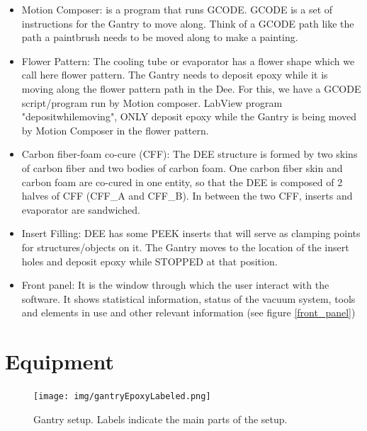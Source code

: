 \documentclass[12pt]{cornelltfpxsop}
\begin{document}
\begin{itemize}
    \item Motion Composer: is a program that runs GCODE. GCODE is a set of instructions for the Gantry to move along. Think of a GCODE path like the path a paintbrush needs to be moved along to make a painting.
    \item Flower Pattern: The cooling tube or evaporator has a flower shape which we call here flower pattern. The Gantry needs to deposit epoxy while it is moving along the flower pattern path in the Dee. For this, we have a GCODE script/program run by Motion composer. LabView program "depositwhilemoving", ONLY deposit epoxy while the Gantry is being moved by Motion Composer in the flower pattern.
    \item Carbon fiber-foam co-cure (CFF): The DEE structure is formed by two skins of carbon fiber and two bodies of carbon foam. One carbon fiber skin and carbon foam are co-cured in one entity, so that the DEE is composed of 2 halves of CFF (CFF\_A and CFF\_B). In between the two CFF, inserts and evaporator are sandwiched.    
    \item Insert Filling: DEE has some PEEK inserts that will serve as clamping points for structures/objects on it. The Gantry moves to the location of the insert holes and deposit epoxy while STOPPED at that position. 
    \item Front panel: It is the window through which the user interact with the software. It shows statistical information, status of the vacuum system, tools and elements in use and other relevant information (see figure \ref{front_panel})
\end{itemize}


\section{Equipment}
\begin{center}
\begin{figure}[h!]
\texttt{[image: img/gantryEpoxyLabeled.png]}
\caption{Gantry setup. Labels indicate the main parts of the setup.}
\label{gantry_setup}
\end{figure}
\end{center}
\end{document}
